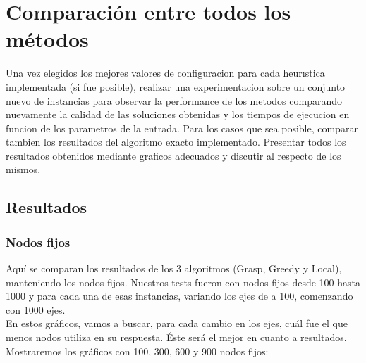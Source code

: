 \section{Comparaci\'on entre todos los m\'etodos}

Una vez elegidos los mejores valores de configuracion para cada heurıstica implementada (si fue posible), realizar una experimentacion sobre un conjunto nuevo de instancias para observar la performance
de los metodos comparando nuevamente la calidad de las soluciones obtenidas y los tiempos de ejecucion en funcion de los parametros de la entrada. 
Para los casos que sea posible, comparar tambien los resultados del algoritmo exacto implementado.
Presentar todos los resultados obtenidos mediante graficos adecuados y discutir al respecto de los mismos.
\subsection{Resultados}
\subsubsection{Nodos fijos}
Aqu\'i se comparan los resultados de los 3 algoritmos (Grasp, Greedy y Local), manteniendo los nodos fijos. Nuestros tests fueron con nodos fijos desde 100 hasta 1000 y para cada una de esas instancias,
variando los ejes de a 100, comenzando con 1000 ejes.\\

En estos gr\'aficos, vamos a buscar, para cada cambio en los ejes, cu\'al fue el que menos nodos utiliza en su respuesta. \'Este ser\'a el mejor en cuanto a resultados.\\

Mostraremos los gr\'aficos con 100, 300, 600 y 900 nodos fijos:

